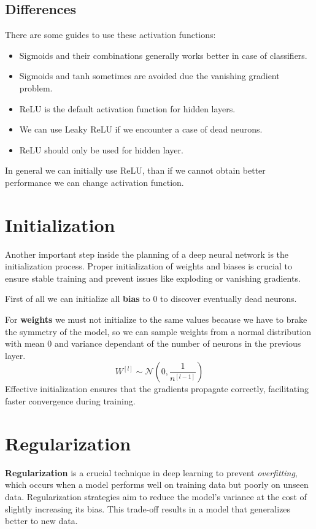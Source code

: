\subsection{Differences}
There are some guides to use these activation functions:
\begin{itemize}
    \item Sigmoids and their combinations generally works better in case of classifiers.
    \item Sigmoids and tanh sometimes are avoided due the vanishing gradient problem.
    \item ReLU is the default activation function for hidden layers.
    \item We can use Leaky ReLU if we encounter a case of dead neurons.
    \item ReLU should only be used for hidden layer.
\end{itemize}
In general we can initially use ReLU, than if we cannot obtain better performance
we can change activation function.
\section{Initialization}
Another important step inside the planning of a deep neural network is the
initialization process. Proper initialization of weights and biases is crucial
to ensure stable training and prevent issues like exploding or vanishing gradients.

First of all we can initialize all \textbf{bias} to $0$ to discover eventually
dead neurons.

For \textbf{weights} we must not initialize to the same values because we have to
brake the symmetry of the model, so we can sample weights from a normal
distribution with mean $0$ and variance dependant of the number of neurons in
the previous layer.
\begin{equation*}
    W^{[l]} \sim \mathcal{N}\left(0, \frac{1}{n^{[l-1]}}\right)
\end{equation*}
Effective initialization ensures that the gradients propagate correctly,
facilitating faster convergence during training.
\section{Regularization}
\textbf{Regularization} is a crucial technique in deep learning to prevent
\textit{overfitting}, which occurs when a model performs well on training data
but poorly on unseen data. Regularization strategies aim to reduce the model's
variance at the cost of slightly increasing its bias. This trade-off results in
a model that generalizes better to new data.

